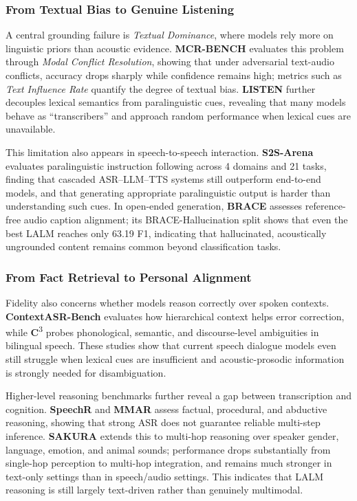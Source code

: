 \documentclass{llmxive}
\begin{document}
\subsubsection{From Textual Bias to Genuine Listening}
\label{sec:5.1.2}
A central grounding failure is \textit{Textual Dominance}, where models rely more on linguistic priors than acoustic evidence. \textbf{MCR-BENCH} \cite{wang2025audio} evaluates this problem through \textit{Modal Conflict Resolution}, showing that under adversarial text-audio conflicts, accuracy drops sharply while confidence remains high; metrics such as \textit{Text Influence Rate} quantify the degree of textual bias. \textbf{LISTEN} \cite{chen2025audio} further decouples lexical semantics from paralinguistic cues, revealing that many models behave as ``transcribers'' and approach random performance when lexical cues are unavailable.

This limitation also appears in speech-to-speech interaction. \textbf{S2S-Arena} \cite{jiang2025s2s} evaluates paralinguistic instruction following across 4 domains and 21 tasks, finding that cascaded ASR--LLM--TTS systems still outperform end-to-end models, and that generating appropriate paralinguistic output is harder than understanding such cues. In open-ended generation, \textbf{BRACE} \cite{guo2025brace} assesses reference-free audio caption alignment; its BRACE-Hallucination split shows that even the best LALM reaches only 63.19 F1, indicating that hallucinated, acoustically ungrounded content remains common beyond classification tasks.

\subsubsection{From Fact Retrieval to Personal Alignment}
\label{sec:5.1.3}
Fidelity also concerns whether models reason correctly over spoken contexts. \textbf{ContextASR-Bench} \cite{wang2025contextasr} evaluates how hierarchical context helps error correction, while \textbf{C}\textsuperscript{3} \cite{ma2025c3} probes phonological, semantic, and discourse-level ambiguities in bilingual speech. These studies show that current speech dialogue models even still struggle when lexical cues are insufficient and acoustic-prosodic information is strongly needed for disambiguation.

Higher-level reasoning benchmarks further reveal a gap between transcription and cognition. \textbf{SpeechR} \cite{yang2025speechr} and \textbf{MMAR} \cite{ma2025mmar} assess factual, procedural, and abductive reasoning, showing that strong ASR does not guarantee reliable multi-step inference. \textbf{SAKURA} \cite{yang2025sakura} extends this to multi-hop reasoning over speaker gender, language, emotion, and animal sounds; performance drops substantially from single-hop perception to multi-hop integration, and remains much stronger in text-only settings than in speech/audio settings. This indicates that LALM reasoning is still largely text-driven rather than genuinely multimodal.
\end{document}
